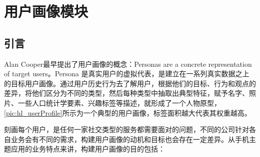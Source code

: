 
\chapter{用户画像模块}
\section{引言}
\label{chap:example}
Alan Cooper最早提出了用户画像的概念：Personas are a concrete representation of target users。Persona 是真实用户的虚拟代表，是建立在一系列真实数据之上的目标用户画像。通过用户历史行为去了解用户，根据他们的目标、行为和观点的差异，将他们区分为不同的类型，然后每种类型中抽取出典型特征，赋予名字、照片、一些人口统计学要素、兴趣标签等描述，就形成了一个人物原型，\autoref{pic:hl_userProfile}所示为一个典型的用户画像，标签面积越大代表其权重越高。

刻画每个用户，是任何一家社交类型的服务都需要面对的问题，不同的公司针对各自业务会有不同的需求，构建用户画像的动机和目标也会存在一定差异。从手机主题应用的业务特点来讲，构建用户画像的目的包括：

\begin{figure}
\centering
  \label{pic:hl_userProfile}
\end{figure}

